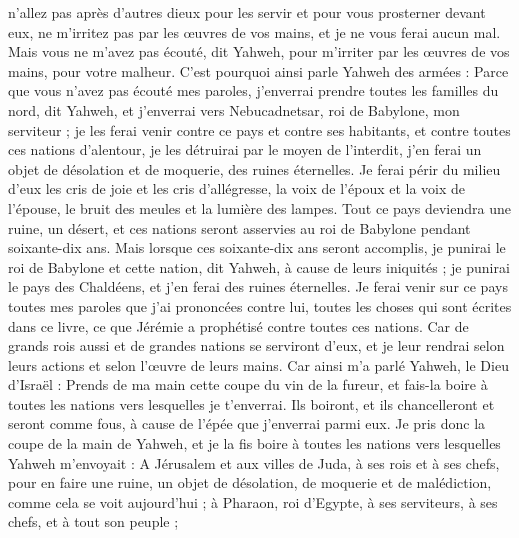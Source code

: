 \begin{multicols}{2}
n'allez pas après d'autres dieux pour les servir et pour vous prosterner devant eux, ne m'irritez pas par les œuvres de vos mains, et je ne vous ferai aucun mal.
Mais vous ne m'avez pas écouté, dit Yahweh, pour m'irriter par les œuvres de vos mains, pour votre malheur.
C'est pourquoi ainsi parle Yahweh des armées : Parce que vous n'avez pas écouté mes paroles,
j'enverrai prendre toutes les familles du nord, dit Yahweh, et j'enverrai vers Nebucadnetsar, roi de Babylone, mon serviteur ; je les ferai venir contre ce pays et contre ses habitants, et contre toutes ces nations d'alentour, je les détruirai par le moyen de l'interdit, j'en ferai un objet de désolation et de moquerie, des ruines éternelles.
Je ferai périr du milieu d'eux les cris de joie et les cris d'allégresse, la voix de l'époux et la voix de l'épouse, le bruit des meules et la lumière des lampes.
Tout ce pays deviendra une ruine, un désert, et ces nations seront asservies au roi de Babylone pendant soixante-dix ans.
Mais lorsque ces soixante-dix ans seront accomplis, je punirai le roi de Babylone et cette nation, dit Yahweh, à cause de leurs iniquités ; je punirai le pays des Chaldéens, et j'en ferai des ruines éternelles.
Je ferai venir sur ce pays toutes mes paroles que j'ai prononcées contre lui, toutes les choses qui sont écrites dans ce livre, ce que Jérémie a prophétisé contre toutes ces nations.
Car de grands rois aussi et de grandes nations se serviront d'eux, et je leur rendrai selon leurs actions et selon l'œuvre de leurs mains.
Car ainsi m'a parlé Yahweh, le Dieu d'Israël : Prends de ma main cette coupe du vin de la fureur, et fais-la boire à toutes les nations vers lesquelles je t'enverrai.
Ils boiront, et ils chancelleront et seront comme fous, à cause de l'épée que j'enverrai parmi eux.
Je pris donc la coupe de la main de Yahweh, et je la fis boire à toutes les nations vers lesquelles Yahweh m'envoyait :
A Jérusalem et aux villes de Juda, à ses rois et à ses chefs, pour en faire une ruine, un objet de désolation, de moquerie et de malédiction, comme cela se voit aujourd'hui ;
à Pharaon, roi d'Egypte, à ses serviteurs, à ses chefs, et à tout son peuple ;

\end{multicols}
